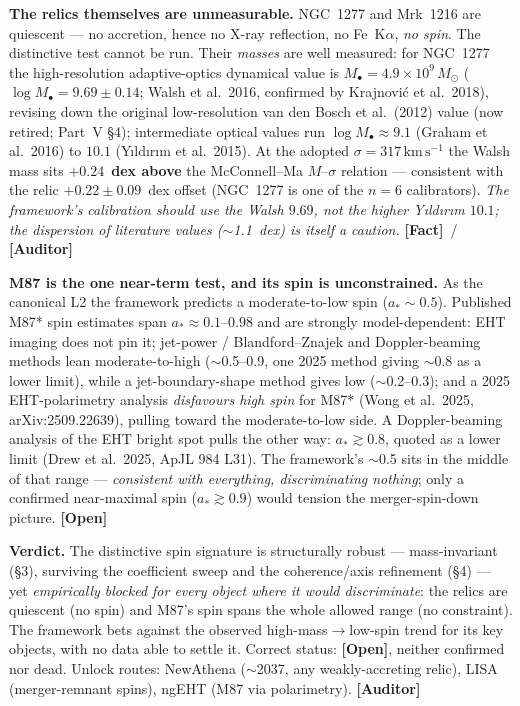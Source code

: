 \documentclass[11pt]{article}
\newcommand{\Fact}{\textbf{\textcolor{green!45!black}{[Fact]}}}
\newcommand{\Open}{\textbf{\textcolor{gray!10!black}{[Open]}}}
\newcommand{\Auditor}{\textbf{\textcolor{teal!55!black}{[Auditor]}}}
\newcommand{\msun}{M_\odot}
\begin{document}
\textbf{The relics themselves are unmeasurable.} NGC~1277 and Mrk~1216 are quiescent --- no accretion, hence no X-ray reflection, no Fe~K$\alpha$, \emph{no spin}. The distinctive test cannot be run. Their \emph{masses} are well measured: for NGC~1277 the high-resolution adaptive-optics dynamical value is $M_\bullet=4.9\times10^{9}\,\msun$ ($\log M_\bullet=9.69\pm0.14$; Walsh et al.\ 2016, confirmed by Krajnovi\'c et al.\ 2018), revising down the original low-resolution van den Bosch et al.\ (2012) value (now retired; Part~V \S4); intermediate optical values run $\log M_\bullet\!\approx\!9.1$ (Graham et al.\ 2016) to $10.1$ (Y\i ld\i r\i m et al.\ 2015). At the adopted $\sigma=317\,\mathrm{km\,s^{-1}}$ the Walsh mass sits $\mathbf{+0.24}$~\textbf{dex above} the McConnell--Ma $M$--$\sigma$ relation --- consistent with the relic $+0.22\pm0.09$~dex offset (NGC~1277 is one of the $n=6$ calibrators). \emph{The framework's calibration should use the Walsh $9.69$, not the higher Y\i ld\i r\i m $10.1$; the dispersion of literature values ($\sim$1.1~dex) is itself a caution.} \Fact\ / \Auditor

\textbf{M87 is the one near-term test, and its spin is unconstrained.} As the canonical L2 the framework predicts a moderate-to-low spin ($a_\ast\!\sim\!0.5$). Published M87* spin estimates span $a_\ast\!\approx\!0.1$--$0.98$ and are strongly model-dependent: EHT imaging does not pin it; jet-power / Blandford--Znajek and Doppler-beaming methods lean moderate-to-high ($\sim$0.5--0.9, one 2025 method giving $\sim$0.8 as a lower limit), while a jet-boundary-shape method gives low ($\sim$0.2--0.3); and a 2025 EHT-polarimetry analysis \emph{disfavours high spin} for M87* (Wong et al.\ 2025, arXiv:2509.22639), pulling toward the moderate-to-low side. A Doppler-beaming analysis of the EHT bright spot pulls the other way: $a_*\gtrsim0.8$, quoted as a lower limit (Drew et al.\ 2025, ApJL 984 L31). The framework's $\sim$0.5 sits in the middle of that range --- \emph{consistent with everything, discriminating nothing}; only a confirmed near-maximal spin ($a_\ast\!\gtrsim\!0.9$) would tension the merger-spin-down picture. \Open

\textbf{Verdict.} The distinctive spin signature is structurally robust --- mass-invariant (\S3), surviving the coefficient sweep and the coherence/axis refinement (\S4) --- yet \emph{empirically blocked for every object where it would discriminate}: the relics are quiescent (no spin) and M87's spin spans the whole allowed range (no constraint). The framework bets against the observed high-mass$\to$low-spin trend for its key objects, with no data able to settle it. Correct status: \Open, neither confirmed nor dead. Unlock routes: NewAthena ($\sim$2037, any weakly-accreting relic), LISA (merger-remnant spins), ngEHT (M87 via polarimetry). \Auditor
\end{document}

